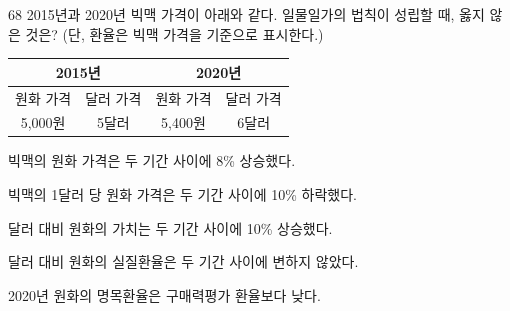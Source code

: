 \begin{question}{68}
2015년과 2020년 빅맥 가격이 아래와 같다. 일물일가의 법칙이 성립할 때, 옳지 않은 것은? (단, 환율은 빅맥 가격을 기준으로 표시한다.) \par
{\small\centering
\begin{tabular}{|c|c|c|c|}\hline
\multicolumn{2}{|c|}{2015년} & \multicolumn{2}{c|}{2020년} \\ \hline
원화 가격 & 달러 가격 & 원화 가격 & 달러 가격 \\ \hline
5,000원 & 5달러 & 5,400원 & 6달러 \\ \hline
\end{tabular}\par}
\begin{choices}
  \item 빅맥의 원화 가격은 두 기간 사이에 8\% 상승했다.
  \item 빅맥의 1달러 당 원화 가격은 두 기간 사이에 10\% 하락했다.
  \item 달러 대비 원화의 가치는 두 기간 사이에 10\% 상승했다.
  \item 달러 대비 원화의 실질환율은 두 기간 사이에 변하지 않았다.
  \item 2020년 원화의 명목환율은 구매력평가 환율보다 낮다.
\end{choices}
\end{question}
